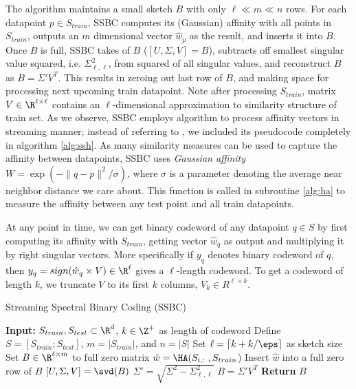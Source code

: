\documentclass{sig-alternate}
\begin{document}
The algorithm maintains a small sketch $B$ with only $\ell \ll m \ll n$ rows. For each datapoint $p \in S_{train}$, SSBC computes its (Gaussian) affinity with all points in $S_{train}$, outputs an $m$ dimensional vector $\hat w_p$ as the result, and inserts it into $B$. Once $B$ is full, SSBC takes \svd of $B$ ($[U,\Sigma,V] = B$), subtracts off smallest singular value squared, i.e. $\Sigma_{\ell, \ell}^2$, from squared of all singular values, and reconstruct $B$ as $B = \Sigma' V^T$. This results in zeroing out last row of $B$, and making space for processing next upcoming train datapoint. Note after processing $S_{train}$, matrix $V \in \R^{\ell \times \ell}$ contains an $\ell$-dimensional approximation to similarity structure of train set. 
As we observe, SSBC employs \FD algorithm \cite{Lib12} to process affinity vectors in streaming manner; instead of referring to \FD, we included its pseudocode completely in algorithm \ref{alg:ssh}. 
As many similarity measures can be used to capture the affinity between datapoints, SSBC uses \textit{Gaussian affinity} $W=\exp \left(-\|q-p\|^2/\sigma \right)$, where $\sigma$ is a parameter denoting the average near neighbor distance we care about. 
This function is called in subroutine \ref{alg:ha} to measure the affinity between any test point and all train datapoints.


At any point in time, we can get binary codeword of any datapoint $q \in S$ by first computing its affinity with $S_{train}$, getting vector $\hat{w}_q$ as output and multiplying it by right singular vectors. More specifically if $y_q$ denotes binary codeword of $q$, then $y_q = sign(\hat{w}_q \times V) \in \R^{\ell}$ gives a $\ell$-length codeword. To get a codeword of length $k$, we truncate $V$ to its first $k$ columns, $V_k \in R^{\ell \times k}$. 


\begin{algorithm}
\caption{\label{alg:ssh} Streaming Spectral Binary Coding (SSBC)}
\begin{algorithmic}
\STATE \textbf{Input:} $S_{train}, S_{test} \subset \R^{d}$, $k \in \Z^+$ as length of codeword
\STATE Define $S = [S_{train};S_{test}]$, $m = |S_{train}|$, and $n = |S|$
\STATE Set $\ell = \lceil k + k/\eps \rceil$ as sketch size
\STATE Set $B \in \R^{\ell \times m}$ to full zero matrix
  \STATE $\hat w = \HA(S_{i,:}\; , S_{train}$)
  \STATE Insert $\hat w$ into a full zero row of $B$
    \STATE $[U,\Sigma,V] = \svd(B)$
    \STATE $\Sigma' = \sqrt{\Sigma^2 - \Sigma_{\ell,\ell}^2}$
    \STATE $B = \Sigma'V^T$
  \ENDIF
\ENDFOR
\STATE \textbf{Return} $B$
\end{algorithmic}
\end{algorithm}
\end{document}
